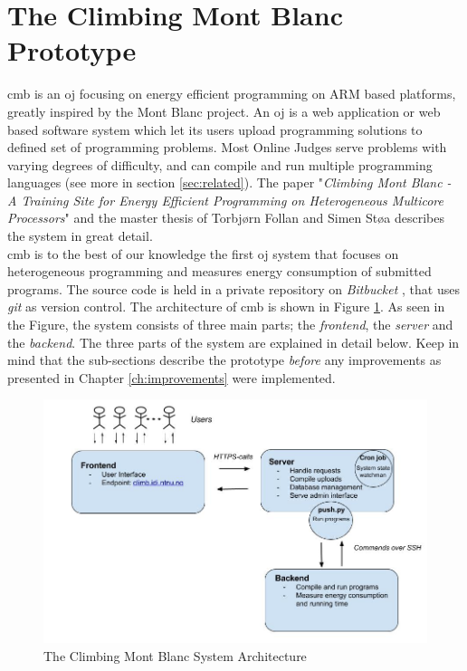 \section{The Climbing Mont Blanc Prototype}
\label{sec:cmb}
\gls{cmb} is an \gls{oj} focusing on energy efficient programming on ARM based platforms, greatly inspired by the Mont Blanc project. An \gls{oj} is a web application or web based software system which let its users upload programming solutions to defined set of programming problems. Most Online Judges serve problems with varying degrees of difficulty, and can compile and run multiple programming languages (see more in section \ref{sec:related}). The paper "\textit{Climbing Mont Blanc - A Training Site for Energy Efficient Programming on Heterogeneous Multicore Processors}" \cite{a:CMB} and the master thesis of Torbjørn Follan and Simen Støa \cite{mt:T&S} describes the system in great detail. \\

\gls{cmb} is to the best of our knowledge the first \gls{oj} system that focuses on heterogeneous programming and measures energy consumption of submitted programs. The source code is held in a private repository on \textit{Bitbucket} \cite{BITBUCKET}, that uses \textit{git} \cite{GIT} as version control. The architecture of \gls{cmb} is shown in Figure \ref{fig:cmb_arch}. As seen in the Figure, the system consists of three main parts; the \textit{frontend}, the \textit{server} and the \textit{backend}. The three parts of the system are explained in detail below. Keep in mind that the sub-sections describe the prototype \textit{before} any improvements as presented in Chapter \ref{ch:improvements} were implemented.

\begin{figure}
  \includegraphics[width=1.0\textwidth]{figs/cmb_arch.jpg}
  \caption[The Climbing Mont Blanc System Architecture]{The Climbing Mont Blanc System Architecture}
  \label{fig:cmb_arch}
\end{figure}

